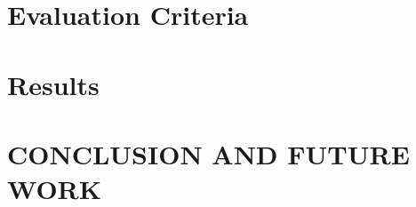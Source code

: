 \documentclass{sig-alternate}
\begin{document}
\section{Evaluation Criteria}

\section{Results}

\section{CONCLUSION AND FUTURE WORK}




\end{document}
